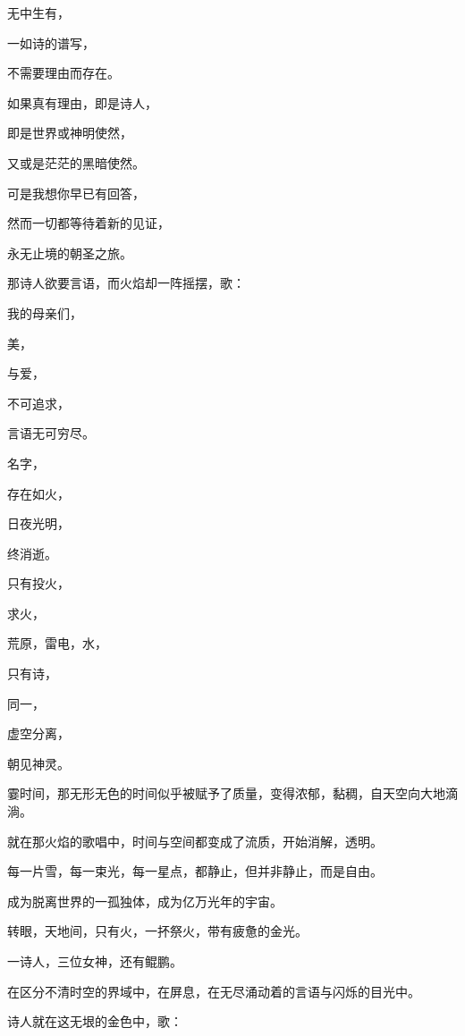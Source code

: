 \documentclass[UTF8]{article}
\begin{document}
\par 无中生有，
\par 一如诗的谱写，
\par 不需要理由而存在。
\par 如果真有理由，即是诗人，
\par 即是世界或神明使然，
\par 又或是茫茫的黑暗使然。
\par 可是我想你早已有回答，
\par 然而一切都等待着新的见证，
\par 永无止境的朝圣之旅。
\\[0.6cm]
\par 那诗人欲要言语，而火焰却一阵摇摆，歌：
\\[0.6cm]
\par 我的母亲们，
\par 美，
\par 与爱，
\par 不可追求，
\par 言语无可穷尽。
\par 名字，
\par 存在如火，
\par 日夜光明，
\par 终消逝。
\par 只有投火，
\par 求火，
\par 荒原，雷电，水，
\par 只有诗，
\par 同一，
\par 虚空分离，
\par 朝见神灵。
\\[0.6cm]
\par 霎时间，那无形无色的时间似乎被赋予了质量，变得浓郁，黏稠，自天空向大地滴淌。
\par 就在那火焰的歌唱中，时间与空间都变成了流质，开始消解，透明。
\par 每一片雪，每一束光，每一星点，都静止，但并非静止，而是自由。
\par 成为脱离世界的一孤独体，成为亿万光年的宇宙。
\\[0.6cm]
\par 转眼，天地间，只有火，一抔祭火，带有疲惫的金光。
\par 一诗人，三位女神，还有鲲鹏。
\par 在区分不清时空的界域中，在屏息，在无尽涌动着的言语与闪烁的目光中。
\\[0.6cm]
\par 诗人就在这无垠的金色中，歌：
\\[0.6cm]
\end{document}
